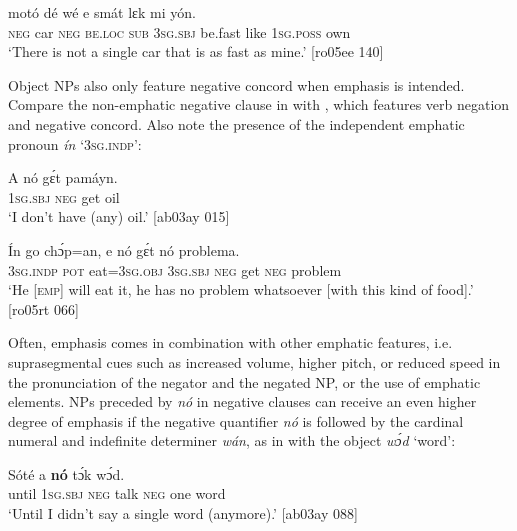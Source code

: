 \ea%
    \label{ex:key:551}
    \gll {}  motó    dé    wé  e    smát  lɛk  mi    yón.\\
\textsc{neg}  car    \textsc{neg}  \textsc{be.loc}  \textsc{sub}  \textsc{3sg.sbj}  be.fast  like  \textsc{1sg.poss}  own\\

\glt ‘There is not a single car that is as fast as mine.’ [ro05ee 140]
\z

Object NPs also only feature negative concord when emphasis is intended. Compare the non-emphatic negative clause in  with , which features verb negation and negative concord. Also note the presence of the independent emphatic pronoun \textit{ín} ‘\textsc{3sg.indp}’:


\ea%
    \label{ex:key:552}
    \gll A    nó  gɛ́t  pamáyn.\\
\textsc{1sg.sbj}  \textsc{neg}  get  oil\\

\glt ‘I don’t have (any) oil.’ [ab03ay 015]
\z


\ea%
    \label{ex:key:553}
    \gll \'{I}n    go  chɔ́p=an,    e    nó  gɛ́t  nó  problema.\\
\textsc{3sg.indp}  \textsc{pot}  eat=\textsc{3sg.obj}  \textsc{3sg.sbj}  \textsc{neg}  get  \textsc{neg}  problem\\

\glt ‘He [\textsc{emp}] will eat it, he has no problem whatsoever [with this kind of food].’ [ro05rt 066]
\z


Often, emphasis comes in combination with other emphatic features, i.e. suprasegmental cues such as increased volume, higher pitch, or reduced speed in the pronunciation of the negator and the negated \textsc{NP,} or the use of emphatic elements. NPs preceded by \textit{nó} in negative clauses can receive an even higher degree of emphasis if the negative quantifier \textit{nó} is followed by the cardinal numeral and indefinite determiner \textit{wán}, as in  with the object \textit{wɔ́d} ‘word’:


\ea%
    \label{ex:key:554}
    \gll Sóté    a    \textbf{nó}  tɔ́k        wɔ́d.\\
until  \textsc{1sg.sbj}  \textsc{neg}  talk  \textsc{neg}  one    word\\

\glt ‘Until I didn’t say a single word (anymore).’ [ab03ay 088]
\z

